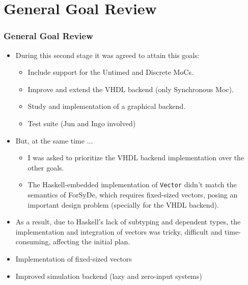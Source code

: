 \documentclass{beamer}
\begin{document}
\section{General Goal Review}
\begin{frame}
\frametitle{General Goal Review}
\begin{itemize}
\item During this second stage it was agreed to attain this goals:
  \begin{itemize}
\pause
  \item Include support for the Untimed and Discrete MoCs.
    \pause      
  \item Improve and extend the VHDL backend (only Synchronous Moc).
    \pause
  \item Study and implementation of a graphical backend.
    \pause
  \item Test suite (Jun and Ingo involved)
  \end{itemize}
\pause
\item But, at the same time ...
  \begin{itemize}
  \item I was asked to prioritize the VHDL backend implementation over the other goals.
    \pause
  \item The Haskell-embedded implementation of \texttt{Vector} didn't match the semantics of ForSyDe, which requires fixed-sized vectors, posing an important design problem (specially for the VHDL backend).
  \end{itemize}
\pause
\item  As a result, due to Haskell's lack of subtyping and dependent types, the implementation and integration of vectors
  was tricky, difficult and time-consuming, affecting the initial plan.
\pause
\item Implementation of fixed-sized vectors  
\item Improved simulation backend (lazy and zero-input systems) 
\end{itemize}  
\end{frame}
\end{document}
